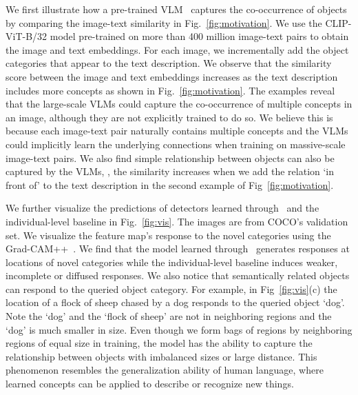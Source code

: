 We first illustrate how a pre-trained VLM~\cite{radford2021learning} captures the co-occurrence of objects by comparing the image-text similarity in Fig.~\ref{fig:motivation}. 
We use the CLIP-ViT-B/32 model pre-trained on more than 400 million image-text pairs to obtain the image and text embeddings.
For each image, we incrementally add the object categories that appear to the text description. 
We observe that the similarity score between the image and text embeddings increases as the text description includes more concepts as shown in Fig.~\ref{fig:motivation}.
The examples reveal that the large-scale VLMs could capture the co-occurrence of multiple concepts in an image, although they are not explicitly trained to do so.
We believe this is because each image-text pair naturally contains multiple concepts and the VLMs could implicitly learn the underlying connections when training on massive-scale image-text pairs. We also find simple relationship between objects can also be captured by the VLMs, \eg, the similarity increases when we add the relation `in front of' to the text description in the second example of Fig~\ref{fig:motivation}.

 We further visualize the predictions of detectors learned through \method~and the individual-level baseline in Fig.~\ref{fig:vis}. 
The images are from COCO's validation set. We visualize the feature map's response to the novel categories using the Grad-CAM++~\cite{chattopadhay2018grad}.
We find that the model learned through \method~generates responses at locations of novel categories while the individual-level baseline induces weaker, incomplete or diffused responses.
We also notice that semantically related objects can respond to the queried object category.
For example, in Fig~\ref{fig:vis}(c) the location of a flock of sheep chased by a dog responds to the queried object `dog'. Note the `dog' and the `flock of sheep' are not in neighboring regions and the `dog' is much smaller in size. Even though we form bags of regions by neighboring regions of equal size in training, the model has the ability to capture the relationship between objects with imbalanced sizes or large distance. This phenomenon resembles the generalization ability of human language, where learned concepts can be applied to describe or recognize new things.
